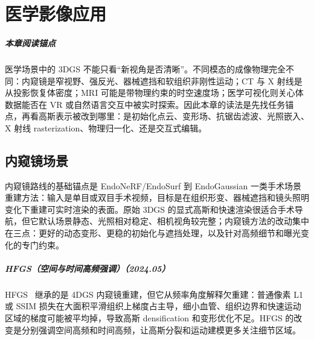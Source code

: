 \chapter{医学影像应用}

\paragraph*{本章阅读锚点}
医学场景中的 3DGS 不能只看“新视角是否清晰”。不同模态的成像物理完全不同：内窥镜是窄视野、强反光、器械遮挡和软组织非刚性运动；CT 与 X 射线是从投影恢复体密度；MRI 可能是带物理约束的时空速度场；医学可视化则关心体数据能否在 VR 或自然语言交互中被实时探索。因此本章的读法是先找任务锚点，再看高斯表示被改到哪里：是初始化点云、变形场、抗锯齿滤波、光照嵌入、X 射线 rasterization、物理归一化、还是交互式编辑。

\section{内窥镜场景}

内窥镜路线的基础锚点是 EndoNeRF/EndoSurf 到 EndoGaussian 一类手术场景重建方法：输入是单目或双目手术视频，目标是在组织形变、器械遮挡和镜头照明变化下重建可实时渲染的表面。原始 3DGS 的显式高斯和快速渲染很适合手术导航，但它默认场景静态、光照相对稳定、相机视角较完整；内窥镜方法的改动集中在三点：更好的动态变形、更稳的初始化与遮挡处理，以及针对高频细节和曝光变化的专门约束。



\paragraph{HFGS（空间与时间高频强调）（2024.05）}
HFGS~\cite{2405_17872} 继承的是 4DGS 内窥镜重建，但它从频率角度解释欠重建：普通像素 L1 或 SSIM 损失在大面积平滑组织上梯度占主导，细小血管、组织边界和快速运动区域的梯度可能被平均掉，导致高斯 densification 和变形优化不足。HFGS 的改变是分别强调空间高频和时间高频，让高斯分裂和运动建模更多关注细节区域。

